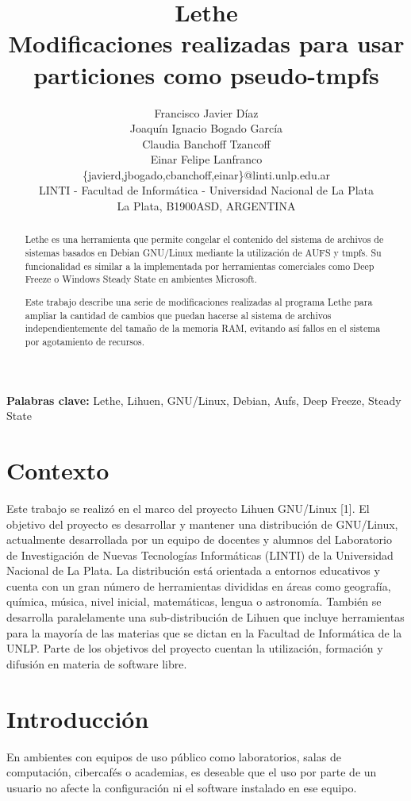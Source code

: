 \documentclass[final,narroweqnarray,inline,twoside]{ieee}
\author{Francisco Javier Díaz \\Joaquín Ignacio Bogado García \\
Claudia Banchoff Tzancoff\\Einar Felipe Lanfranco \\ \{javierd,jbogado,cbanchoff,einar\}@linti.unlp.edu.ar
\\LINTI - Facultad de Informática - Universidad Nacional de La Plata
\\La Plata, B1900ASD, ARGENTINA}
\title{Lethe\\Modificaciones realizadas para usar particiones como pseudo-tmpfs}
\newcommand{\itref}[1]{[{#1}]}
\begin{document}
\maketitle
\sloppy

\begin{abstract}
\noindent Lethe es una herramienta que permite congelar el contenido del sistema de archivos de sistemas basados en Debian
GNU/Linux mediante la utilización de AUFS y tmpfs. Su funcionalidad es similar a la implementada por herramientas comerciales
como Deep Freeze o Windows Steady State en ambientes Microsoft.

Este trabajo describe una serie de modificaciones realizadas al programa Lethe para ampliar la cantidad de cambios
que puedan hacerse al sistema de archivos independientemente del tamaño de la memoria RAM, evitando así fallos en
el sistema por agotamiento de recursos.
\end{abstract}

\noindent \textbf{Palabras clave: } Lethe, Lihuen, GNU/Linux, Debian, Aufs, Deep Freeze, Steady State

\section{Contexto}
Este trabajo se realizó en el marco del proyecto Lihuen GNU/Linux \itref{1}. El objetivo del proyecto es desarrollar y
mantener una distribución de GNU/Linux, actualmente desarrollada por un equipo de docentes y alumnos del Laboratorio de
Investigación de Nuevas Tecnologías Informáticas (LINTI) de la Universidad Nacional de La Plata. La distribución está
orientada a entornos educativos y cuenta con un gran número de herramientas divididas en áreas como geografía, química,
música, nivel inicial, matemáticas, lengua o astronomía. También se desarrolla paralelamente una sub-distribución de Lihuen
que incluye herramientas para la mayoría de las materias que se dictan en la Facultad de Informática de la UNLP. Parte de los
objetivos del proyecto cuentan la utilización, formación y difusión en materia de software libre. 

\section{Introducción}
En ambientes con equipos de uso público como laboratorios, salas de computación, cibercafés o academias, es deseable que el
uso por parte de un usuario no afecte la configuración ni el software instalado en ese equipo.
\end{document}

